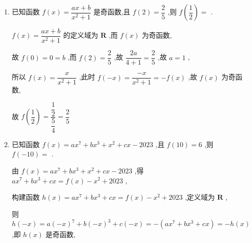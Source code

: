 \begin{enumerate}
\begin{jieda}
        所以 $f\left( 0\right)  = 0$ ,
        
        设 $x > 0$ ,则 $- x < 0,f\left( {-x}\right)  = 2{x}^{2} + x + 1$ ,
        
        又因为 $f\left( x\right)  + f\left( {-x}\right)  = 0$ ,即 $f\left( x\right)  =  - f\left( {-x}\right)$ ,
        
        所以 $f\left( x\right)  =  - 2{x}^{2} - x - 1$
        
        所以 $f\left( x\right)  = \left\{  \begin{array}{l}  - 2{x}^{2} - x - 1,x > 0 \\  0,x = 0 \\  2{x}^{2} - x + 1,x < 0 \end{array}\right.$ .        
    \end{jieda}
    
    \item 已知函数 $f\left( x\right)  = \dfrac{{ax} + b}{{x}^{2} + 1}$ 是奇函数,且 $f\left( 2\right)  = \dfrac{2}{5}$ ,则 $f\left( \dfrac{1}{2}\right)  =$ .
    \begin{jieda}
        $f\left( x\right)  = \dfrac{{ax} + b}{{x}^{2} + 1}$ 的定义域为 $\mathbf{R}$ ,而 $f\left( x\right)$ 为奇函数,
        
        故 $f\left( 0\right)  = 0 = b$ ,而 $f\left( 2\right)  = \dfrac{2}{5}$ ,故 $\dfrac{2a}{4 + 1} = \dfrac{2}{5}$ ,故 $a = 1$ ,
        
        所以 $f\left( x\right)  = \dfrac{x}{{x}^{2} + 1}$ ,此时 $f\left( {-x}\right)  = \dfrac{-x}{{x}^{2} + 1} =  - f\left( x\right)$ ,故 $f\left( x\right)$ 为奇函数,
        
        故 $f\left( \dfrac{1}{2}\right)  = \dfrac{\dfrac{1}{2}}{\dfrac{5}{4}} = \dfrac{2}{5}$
    \end{jieda}
    
    \item 已知函数 $f\left( x\right)  = a{x}^{7} + b{x}^{3} + {x}^{2} + {cx} - {2023}$ ,且 $f\left( {10}\right)  = 6$ ,则 $f\left( {-{10}}\right)  =$ .
    \begin{jieda}
        由 $f\left( x\right)  = a{x}^{7} + b{x}^{3} + {x}^{2} + {cx} - {2023}$ ,得 $a{x}^{7} + b{x}^{3} + {cx} = f\left( x\right)  - {x}^{2} + {2023}$ ,
        
        构建函数 $h\left( x\right)  = a{x}^{7} + b{x}^{3} + {cx} = f\left( x\right)  - {x}^{2} + {2023}$ ,定义域为 $\mathbf{R}$ ,
        
        则 $h\left( {-x}\right)  = a{\left( -x\right) }^{7} + b{\left( -x\right) }^{3} + c\left( {-x}\right)  =  - \left( {a{x}^{7} + b{x}^{3} + {cx}}\right)  =  - h\left( x\right)$ ,即 $h\left( x\right)$ 是奇函数,
        

\end{jieda}
\end{enumerate}
